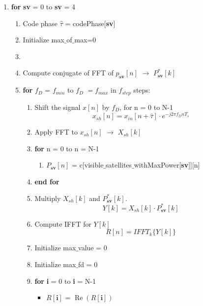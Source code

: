 \documentclass[journal,10pt,onecolumn]{article}
\begin{document}
\begin{enumerate}
    \item  \textbf{for} \textbf{sv} = 0  to \textbf{sv} = 4
    \begin{enumerate}
        \item[] Code phase $\hat{\tau}$ = codePhase[\textbf{sv}]
            \item[] Initialize max$\_$of$\_$max=0
            \item[]  \item[] Compute conjugate of FFT of $p_{\textbf{sv}}[n]$ $\longrightarrow $  $P_{\textbf{sv}}^*[k ]$
            \item[] \textbf{for} \textbf{$f_D$} = $f_{min}$ to \textbf{$f_D$} $= f_{max}$ in $f_{step}$ steps:
            \begin{enumerate}
                \item[] Shift the signal $x[n]$ by $f_D$, for n = 0 to N-1
                \begin{equation}
                    x_{sh}[n] = x_{in}[n+\hat{\tau}]\cdot e ^{-j 2 \pi f_D n T_s} 
                \end{equation}
                \item[] Apply FFT to $x_{sh}[n]$ $\longrightarrow$ $X_{sh}[k]$
                \item[] \textbf{for} n = 0 to n = N-1
                \begin{enumerate}
                    \item[] $P_{\textbf{sv}}[n]$ = c[visible$\_$satellites$\_$withMaxPower[\textbf{sv}]][n] 
                \end{enumerate}
                \item[] \textbf{end for}
                
               
            \item[] Multiply $X_{sh}[k]$ and $P_{\textbf{sv}}^*[k ]$.
                \begin{equation}
                    Y[k] = X_{sh}[k] \cdot P_{\textbf{sv}}^*[k]                
                \end{equation}
            \item[] Compute IFFT for $Y[k]$
                \begin{equation}
                    R[n] =  IFFT_k \{Y[k] \} 
                \end{equation}
            \item[] Initialize max$\_$value = 0
            \item[] Initialize max$\_$fd    = 0
            \item[] \textbf{for} \textbf{i} = 0 to \textbf{i} = N-1
            \begin{itemize}
                \item[] $R[\textbf{i}]$ = $\operatorname{Re}(R[\textbf{i}])$
            \end{itemize}
            

\end{enumerate}
\end{enumerate}
\end{enumerate}
\end{document}
